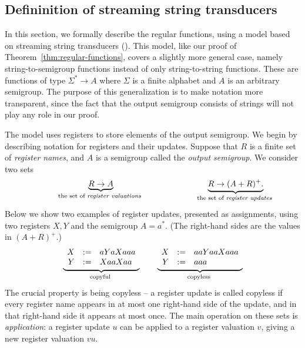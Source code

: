 \subsection{Defininition of streaming string transducers}
\label{sec:sst-definition}
In this section, we formally describe the regular functions, using a model based on streaming string transducers (\sst).  This model, like our proof of Theorem~\ref{thm:regular-functions}, covers a slightly more general case, namely string-to-semigroup functions instead of only string-to-string functions. These are functions of type $\Sigma^* \to A$ where $\Sigma$ is a finite alphabet and $A$ is an arbitrary semigroup.  The purpose of this generalization is to make notation more transparent, since the fact that the output semigroup consists of strings will not play any role in our proof.

The model uses registers to store elements of the output semigroup. We begin by describing notation for registers and their updates. Suppose that $R$ is a finite set of \emph{register names}, and $A$ is a semigroup called the \emph{output semigroup}. We consider two sets 
\begin{align*}
\hspace{2cm}
    \myunderbrace{R \to A}{the set of \emph{register valuations}} 
    \hspace{4cm}
    \myunderbrace{R \to (A+R)^+.}{the set of \emph{register updates}}
\end{align*}
Below we show two examples of register updates, presented as assignments, using two registers $X,Y$ and the semigroup $A = a^*$. (The right-hand sides are the values in $(A+R)^+$.)
\begin{align*}
    \myunderbrace{
    \begin{array}{rcl}
        X &:=& aYaXaaa\\
    Y &:=& XaaXaa
    \end{array}
    }{copyful}
    \qquad 
    \myunderbrace{
    \begin{array}{rcl}
        X &:=& aaYaaXaaa\\
    Y &:=& aaa
    \end{array}
    }{copyless}
    \end{align*}
The crucial property is being copyless -- a register update is called copyless if every register name appears in at most one right-hand side of the update, and in that right-hand side it appears at most once. 
The main operation on these sets is \emph{application}: a register update $u$
can be applied to a register valuation $v$, giving a new register valuation $vu$. 


